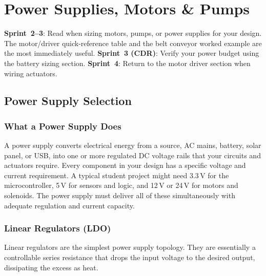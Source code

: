 \chapter{Power Supplies, Motors \& Pumps}\label{ch:motors}

\begin{tipbox}
\textbf{Sprint~2--3}: Read when sizing motors, pumps, or power supplies for your design. The motor/driver quick-reference table and the belt conveyor worked example are the most immediately useful. \textbf{Sprint~3 (CDR)}: Verify your power budget using the battery sizing section. \textbf{Sprint~4}: Return to the motor driver section when wiring actuators.
\end{tipbox}


\vspace{1em}




\vspace{1em}

\section{Power Supply Selection}

\subsection{What a Power Supply Does}

A power supply converts electrical energy from a source, AC mains, battery, solar panel, or USB, into one or more regulated DC voltage rails that your circuits and actuators require. Every component in your design has a specific voltage and current requirement. A typical student project might need 3.3\,V for the microcontroller, 5\,V for sensors and logic, and 12\,V or 24\,V for motors and solenoids. The power supply must deliver all of these simultaneously with adequate regulation and current capacity.

\subsection{Linear Regulators (LDO)}

Linear regulators are the simplest power supply topology. They are essentially a controllable series resistance that drops the input voltage to the desired output, dissipating the excess as heat.

